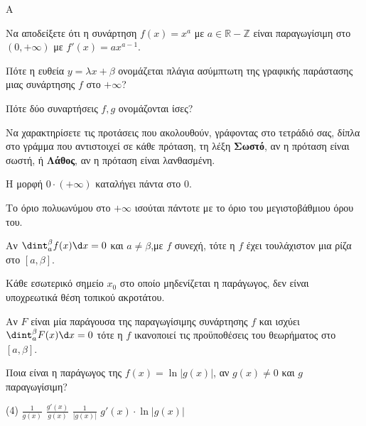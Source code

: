 \begin{thema}{A}
\begin{erwthma}
    \item Να αποδείξετε ότι η συνάρτηση $ f(x)=x^a $ με $ a\in\mathbb{R}-\mathbb{Z} $ είναι παραγωγίσιμη στο $ (0,+\infty) $ με $ f'(x)=ax^{a-1} $.
    \item Πότε η ευθεία $y=\lambda x+\beta$ ονομάζεται πλάγια ασύμπτωτη της γραφικής παράστασης μιας συνάρτησης $f$ στο $+\infty$?
    \item Πότε δύο συναρτήσεις $f, g$ ονομάζονται ίσες?
    \item Να χαρακτηρίσετε τις προτάσεις που ακολουθούν, γράφοντας στο τετράδιό σας, δίπλα στο γράμμα που αντιστοιχεί σε κάθε πρόταση, τη λέξη \textbf{Σωστό}, αν η πρόταση είναι σωστή, ή \textbf{Λάθος}, αν η πρόταση είναι λανθασμένη.
    \begin{alist}
        \item Η μορφή $0 \cdot (+\infty)$ καταλήγει πάντα στο 0.
        \item Το όριο πολυωνύμου στο $+\infty$ ισούται πάντοτε με το όριο του μεγιστοβάθμιου όρου του.
        \item Αν $\dint_a^\beta f(x) \d x = 0$ και $a \ne \beta$,με $f$ συνεχή, τότε η $f$ έχει τουλάχιστον μια ρίζα στο $[a, \beta]$.
        \item Κάθε εσωτερικό σημείο $x_0$ στο οποίο μηδενίζεται η παράγωγος, δεν είναι υποχρεωτικά θέση τοπικού ακροτάτου.
        \item Αν $F$ είναι μία παράγουσα της παραγωγίσιμης συνάρτησης $f$ και ισχύει $\dint_{a}^{\beta}{F(x)\d x}=0$ τότε η $f$ ικανοποιεί τις προϋποθέσεις του θεωρήματος  στο $[a,\beta]$.
    \end{alist}
    \item Ποια είναι η παράγωγος της $f(x) = \ln|g(x)|$, αν $g(x) \ne 0$ και $g$ παραγωγίσιμη?
    \begin{tasks}[label=\let\textdexiakeraia\relax\alph*.](4)
        \task $\frac{1}{g(x)}$
        \task $\frac{g'(x)}{g(x)}$
        \task $\frac{1}{|g(x)|}$
        \task $g'(x) \cdot \ln|g(x)|$
    \end{tasks}
\end{erwthma}
\end{thema}


